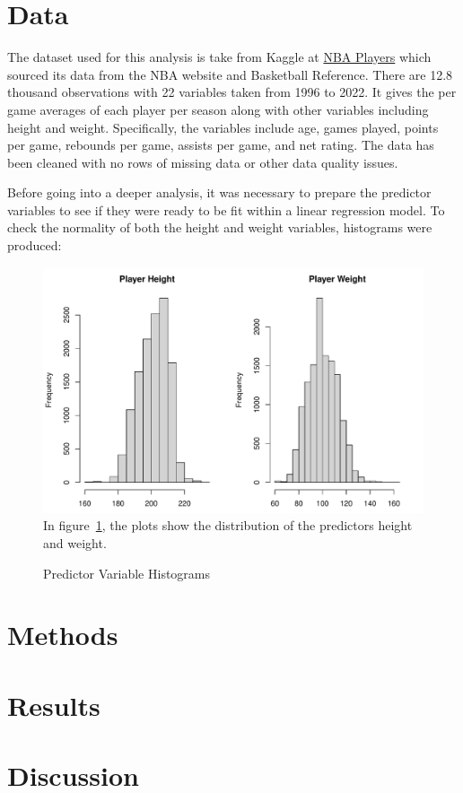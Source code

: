 \documentclass[12pt]{article}
\begin{document}
\section{Data}
\label{sec:data}

The dataset used for this analysis is take from Kaggle at \href{https://www.kaggle.com/datasets/justinas/nba-players-data}{NBA Players} 
which sourced its data from the NBA website and Basketball Reference. There are 12.8 thousand observations
with 22 variables taken from 1996 to 2022. It gives the per game averages of each player per season along with
other variables including height and weight. Specifically, the variables include age, games played, points per game,
rebounds per game, assists per game, and net rating. The data has been cleaned with no rows of missing data or
other data quality issues.

Before going into a deeper analysis, it was necessary to prepare the predictor variables to see if they were ready to
be fit within a linear regression model. To check the normality of both the height and weight variables, histograms
were produced:

\begin{figure}
	\caption{Predictor Variable Histograms}
	\includegraphics[width=1\textwidth]{predhistograms.pdf}
	\label{fig:predhistograms}
In figure~\ref{fig:predhistograms}, the plots show the distribution of the predictors height and weight.
\end{figure}


\section{Methods}
\label{sec:meth}


\section{Results}
\label{sec:resu}

\section{Discussion}
\label{sec:disc}



\end{document}
